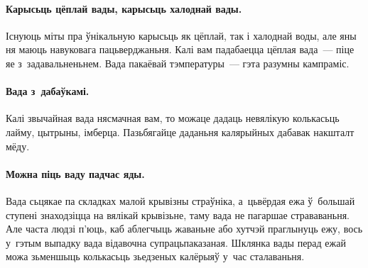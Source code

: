\paragraph{Карысьць цёплай вады, карысьць халоднай вады.}
Існуюць міты пра ўнікальную карысьць як цёплай, так і халоднай воды, але яны ня маюць навуковага пацьверджаньня. Калі вам падабаецца цёплая вада~--- піце яе з~задавальненьнем. Вада пакаёвай тэмпературы~--- гэта разумны кампраміс.

\paragraph{Вада з~дабаўкамі.}
Калі звычайная вада нясмачная вам, то можаце дадаць невялікую колькасьць лайму, цытрыны, імберца. Пазьбягайце даданьня калярыйных дабавак накшталт мёду.

\paragraph{Можна піць ваду падчас яды.}
Вада сьцякае па складках малой крывізны страўніка, а~цьвёрдая ежа ў~большай ступені знаходзіцца на вялікай крывізьне, таму вада не пагаршае страваваньня. Але часта людзі п'юць, каб аблегчыць жаваньне або хутчэй праглынуць ежу, вось у~гэтым выпадку вада відавочна супрацьпаказаная. Шклянка вады перад ежай можа зьменшыць колькасьць зьедзеных калёрыяў у~час сталаваньня.
